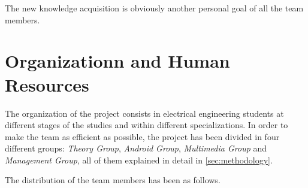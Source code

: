 \documentclass[11pt,a4paper,spanish]{book}  %
\theoremstyle{definition}  %
\theoremstyle{plain}  %
\theoremstyle{remark}  %
\begin{document}
	The new knowledge acquisition is obviously another personal goal of all the team members.
	
	
	\section{Organizationn and Human Resources}
	\label{organization}

The organization of the project consists in electrical engineering students at different stages of the studies and within different specializations. In order to make the team as efficient as possible, the project has been divided in four different groups: \textit{Theory Group}, \textit{Android Group}, \textit{Multimedia Group} and \textit{Management Group}, all of them explained in detail in \ref{sec:methodology}.

The distribution of the team members has been as follows.
\end{document}
